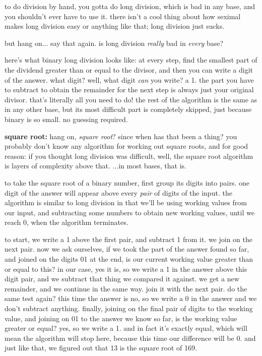 \documentclass[../best.tex]{subfiles}
\begin{document}
\begin{quoting}
	to do division by hand, you gotta do long division, which is bad in any base, and you shouldn't ever have to use it. there isn't a cool thing about how seximal makes long division easy or anything like that; long division just sucks.
\end{quoting}

but hang on... say that again. is long division \emph{really} bad in \emph{every} base?

here's what binary long division looks like: at every step, find the smallest part of the dividend greater than or equal to the divisor, and then you can write a digit of the answer. what digit? well, what digit \emph{can} you write? a 1. the part you have to subtract to obtain the remainder for the next step is always just your original divisor. that's literally all you need to do! the rest of the algorithm is the same as in any other base, but its most difficult part is completely skipped, just because binary is so small. no guessing required.\myfootnote{}

{\bf square root:} hang on, \emph{square root}? since when has that been a thing? you probably don't know any algorithm for working out square roots, and for good reason: if you thought long division was difficult, well, the square root algorithm is layers of complexity above that. ...in most bases, that is.

to take the square root of a binary number, first group its digits into pairs. one digit of the answer will appear above every \emph{pair} of digits of the input. the algorithm is similar to long division in that we'll be using working values from our input, and subtracting some numbers to obtain new working values, until we reach 0, when the algorithm terminates.\myfootnote{}

to start, we write a 1 above the first pair, and subtract 1 from it. we join on the next pair. now we ask ourselves, if we took the part of the answer found so far, and joined on the digits 01 at the end, is our current working value greater than or equal to this? in our case, yes it is, so we write a 1 in the answer above this digit pair, and we subtract that thing we compared it against. we get a new remainder, and we continue in the same way. join it with the next pair. do the same test again? this time the answer is no, so we write a 0 in the answer and we don't subtract anything. finally, joining on the final pair of digits to the working value, and joining on 01 to the answer we know so far, is the working value greater or equal? yes, so we write a 1. and in fact it's exactly equal, which will mean the algorithm will stop here, because this time our difference will be 0. and just like that, we figured out that 13 is the square root of 169.
\end{document}
